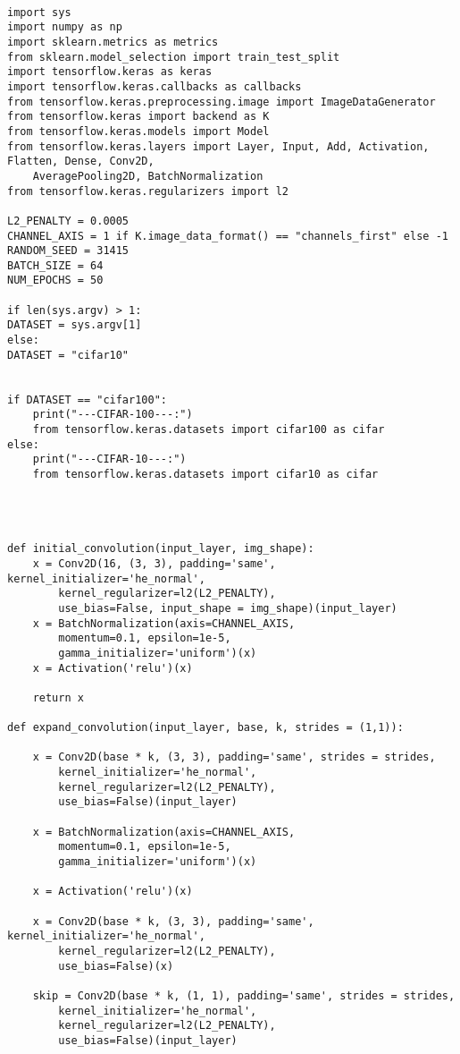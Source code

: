 \documentclass[12pt]{article}
\begin{document}
\begin{adjustwidth}{-50pt}{0pt}
\begin{Verbatim}

import sys
import numpy as np
import sklearn.metrics as metrics
from sklearn.model_selection import train_test_split
import tensorflow.keras as keras
import tensorflow.keras.callbacks as callbacks
from tensorflow.keras.preprocessing.image import ImageDataGenerator
from tensorflow.keras import backend as K
from tensorflow.keras.models import Model
from tensorflow.keras.layers import Layer, Input, Add, Activation, Flatten, Dense, Conv2D,
	AveragePooling2D, BatchNormalization
from tensorflow.keras.regularizers import l2

L2_PENALTY = 0.0005
CHANNEL_AXIS = 1 if K.image_data_format() == "channels_first" else -1
RANDOM_SEED = 31415
BATCH_SIZE = 64
NUM_EPOCHS = 50

if len(sys.argv) > 1:
DATASET = sys.argv[1]
else:
DATASET = "cifar10"


if DATASET == "cifar100":
	print("---CIFAR-100---:")
	from tensorflow.keras.datasets import cifar100 as cifar
else:
	print("---CIFAR-10---:")
	from tensorflow.keras.datasets import cifar10 as cifar




def initial_convolution(input_layer, img_shape):
	x = Conv2D(16, (3, 3), padding='same', kernel_initializer='he_normal',
		kernel_regularizer=l2(L2_PENALTY),
		use_bias=False, input_shape = img_shape)(input_layer)
	x = BatchNormalization(axis=CHANNEL_AXIS,
		momentum=0.1, epsilon=1e-5,
		gamma_initializer='uniform')(x)
	x = Activation('relu')(x)
	
	return x

def expand_convolution(input_layer, base, k, strides = (1,1)):

	x = Conv2D(base * k, (3, 3), padding='same', strides = strides,
		kernel_initializer='he_normal',
		kernel_regularizer=l2(L2_PENALTY),
		use_bias=False)(input_layer)
	
	x = BatchNormalization(axis=CHANNEL_AXIS,
		momentum=0.1, epsilon=1e-5,
		gamma_initializer='uniform')(x)
	
	x = Activation('relu')(x)
	
	x = Conv2D(base * k, (3, 3), padding='same', kernel_initializer='he_normal',
		kernel_regularizer=l2(L2_PENALTY),
		use_bias=False)(x)
	
	skip = Conv2D(base * k, (1, 1), padding='same', strides = strides,
		kernel_initializer='he_normal',
		kernel_regularizer=l2(L2_PENALTY),
		use_bias=False)(input_layer)
	

\end{Verbatim}
\end{adjustwidth}
\end{document}
